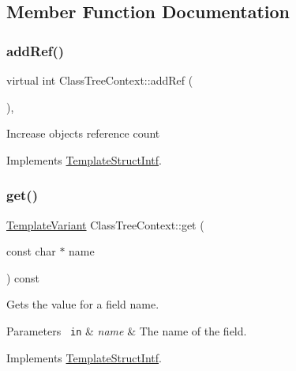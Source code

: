 \subsection{Member Function Documentation}
\mbox{\label{class_class_tree_context_a309d28268edd019326c83f2d9480ba16}} 
\subsubsection{\texorpdfstring{addRef()}{addRef()}}
{\footnotesize\ttfamily virtual int Class\+Tree\+Context\+::add\+Ref (\begin{DoxyParamCaption}{ }\end{DoxyParamCaption})\hspace{0.3cm}{\ttfamily [inline]}, {\ttfamily [virtual]}}

Increase object\textquotesingle{}s reference count 

Implements \mbox{\hyperlink{class_template_struct_intf_a05fe97ad47633beb326f69686faed581}{Template\+Struct\+Intf}}.

\mbox{\label{class_class_tree_context_a3358abb53b7dae8ebc132b1e1b581e9f}} 
\subsubsection{\texorpdfstring{get()}{get()}}
{\footnotesize\ttfamily \mbox{\hyperlink{class_template_variant}{Template\+Variant}} Class\+Tree\+Context\+::get (\begin{DoxyParamCaption}\item[{const char $\ast$}]{name }\end{DoxyParamCaption}) const\hspace{0.3cm}{\ttfamily [virtual]}}

Gets the value for a field name. 
\begin{DoxyParams}[1]{Parameters}
\mbox{\texttt{ in}}  & {\em name} & The name of the field. \\
\hline
\end{DoxyParams}


Implements \mbox{\hyperlink{class_template_struct_intf_a3d610cb81b4adbb531ebed3aa3d09b51}{Template\+Struct\+Intf}}.

